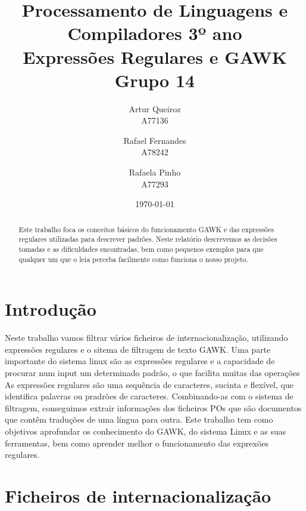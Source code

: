 \documentclass{report}
\title{Processamento de Linguagens e Compiladores 3º ano\\ \textbf{Expressões Regulares e GAWK}\\ Grupo 14}
\author{Artur Queiroz\\ A77136 \and  Rafael Fernandes\\ A78242 \and Rafaela Pinho\\ A77293 }
\date{\today}
\begin{document}
\maketitle

\begin{abstract}
Este trabalho foca os conceitos básicos do funcionamento GAWK e das expressões regulares utilizadas para descrever padrões.
Neste relatório descrevemos as decisões tomadas e as dificuldades encontradas, bem como pequenos exemplos para que qualquer um que o leia perceba facilmente como funciona o nosso projeto.
\end{abstract}

\tableofcontents

\chapter{Introdução} \label{intro}
Neste trabalho vamos filtrar vários ficheiros de internacionalização, utilizando expressões regulares e o sitema de filtragem de texto GAWK. Uma parte importante do sistema linux são as expressões regulares e a capacidade de procurar num input um determinado padrão, o que facilita muitas das operações
As expressões regulares são uma sequência de caracteres, sucinta e flexível, que identifica palavras ou pradrões de caracteres. Combinando-as com o sistema de filtragem, conseguimos extrair informações dos ficheiros POs que são documentos que contêm traduções de uma língua para outra.
Este trabalho tem como objetivos aprofundar os conhecimento do GAWK, do sistema Linux e as suas ferramentas, bem como aprender melhor o funcionamento das exprexões regulares.


\chapter{Ficheiros de internacionalização} \label{fi}
\end{document}
